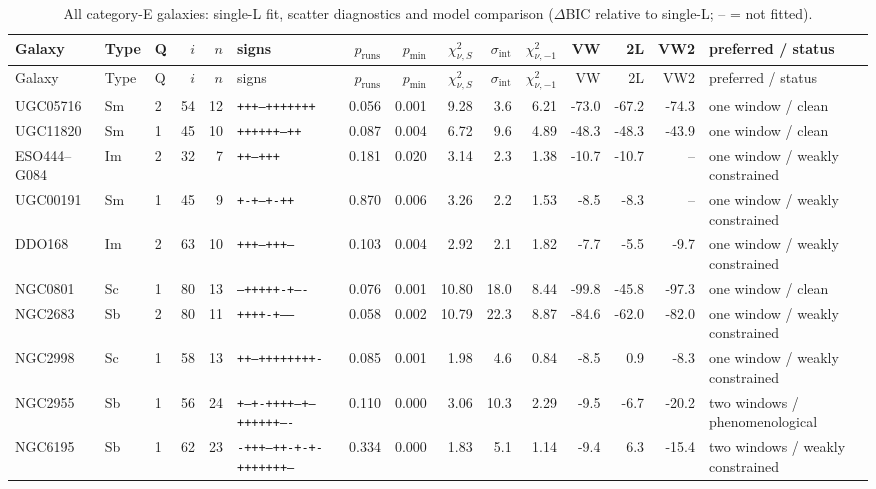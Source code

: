 \documentclass[10pt]{article}
\begin{document}
\clearpage\begin{landscape}{\scriptsize\setlength{\tabcolsep}{3pt}
\begin{longtable}{lllrrlrrrrrrrrl}
\caption{All category-E galaxies: single-L fit, scatter diagnostics and model comparison ($\Delta$BIC relative to single-L; -- = not fitted).}\\\toprule
Galaxy & Type & Q & $i$ & $n$ & signs & $p_\mathrm{runs}$ & $p_\mathrm{min}$ & $\chi^2_{\nu,S}$ & $\sigma_\mathrm{int}$ & $\chi^2_{\nu,-1}$ & VW & 2L & VW2 & preferred / status\\\midrule\endfirsthead
\toprule Galaxy & Type & Q & $i$ & $n$ & signs & $p_\mathrm{runs}$ & $p_\mathrm{min}$ & $\chi^2_{\nu,S}$ & $\sigma_\mathrm{int}$ & $\chi^2_{\nu,-1}$ & VW & 2L & VW2 & preferred / status\\\midrule\endhead\bottomrule\endfoot
UGC05716 & Sm & 2 & 54 & 12 & \texttt{+++--+++++++} & 0.056 & 0.001 & 9.28 & 3.6 & 6.21 & -73.0 & -67.2 & -74.3 & one window / clean\\
UGC11820 & Sm & 1 & 45 & 10 & \texttt{++++++--++} & 0.087 & 0.004 & 6.72 & 9.6 & 4.89 & -48.3 & -48.3 & -43.9 & one window / clean\\
ESO444--G084 & Im & 2 & 32 & 7 & \texttt{++--+++} & 0.181 & 0.020 & 3.14 & 2.3 & 1.38 & -10.7 & -10.7 & -- & one window / weakly constrained\\
UGC00191 & Sm & 1 & 45 & 9 & \texttt{+-+--+-++} & 0.870 & 0.006 & 3.26 & 2.2 & 1.53 & -8.5 & -8.3 & -- & one window / weakly constrained\\
DDO168 & Im & 2 & 63 & 10 & \texttt{+++--+++--} & 0.103 & 0.004 & 2.92 & 2.1 & 1.82 & -7.7 & -5.5 & -9.7 & one window / weakly constrained\\
NGC0801 & Sc & 1 & 80 & 13 & \texttt{--+++++-+----} & 0.076 & 0.001 & 10.80 & 18.0 & 8.44 & -99.8 & -45.8 & -97.3 & one window / clean\\
NGC2683 & Sb & 2 & 80 & 11 & \texttt{++++-+-----} & 0.058 & 0.002 & 10.79 & 22.3 & 8.87 & -84.6 & -62.0 & -82.0 & one window / weakly constrained\\
NGC2998 & Sc & 1 & 58 & 13 & \texttt{++--++++++++-} & 0.085 & 0.001 & 1.98 & 4.6 & 0.84 & -8.5 & 0.9 & -8.3 & one window / weakly constrained\\
NGC2955 & Sb & 1 & 56 & 24 & \texttt{+--+-++++--+--++++++----} & 0.110 & 0.000 & 3.06 & 10.3 & 2.29 & -9.5 & -6.7 & -20.2 & two windows / phenomenological\\
NGC6195 & Sb & 1 & 62 & 23 & \texttt{-+++---++-+-+-+++++++--} & 0.334 & 0.000 & 1.83 & 5.1 & 1.14 & -9.4 & 6.3 & -15.4 & two windows / weakly constrained\\

\end{longtable}}
\end{landscape}
\end{document}
